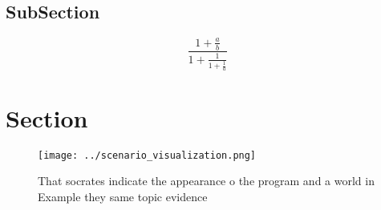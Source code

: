 \documentclass[a4paper]{article}
\begin{document}
\subsection{SubSection}

\[ \frac{1+\frac{a}{b}}{1+\frac{1}{1+\frac{1}{a}}} \]

\section{Section}

\begin{figure}
\centering
\texttt{[image: ../scenario\_visualization.png]}
\caption{That socrates indicate the appearance o the program and a world in Example they same topic evidence
}
\end{figure}
 
\end{document}
